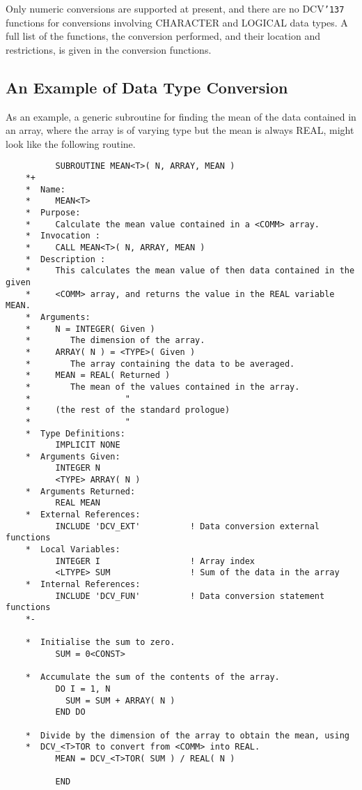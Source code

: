 \documentclass[twoside,11pt]{article}
\renewcommand{\_}{{\tt\char'137}}     %
\newcommand{\htmlref}[2]{#1}
\newcommand{\latexelsehtml}[2]{#1}
\renewcommand{\latexelsehtml}[2]{#2}
\begin{document}
Only numeric conversions are supported at present, and
there are no DCV\_ functions for conversions involving CHARACTER and
LOGICAL data types.
A full list of the functions, the conversion performed, and their
location and restrictions, is given in
\latexelsehtml{Appendix~\ref{ap_b}}{the
\htmlref{conversion functions}{ap_b}}.

\subsection{An Example of Data Type Conversion}

As an example, a generic subroutine for finding the mean of the data
contained in an array, where the array is of varying type but the mean is
always REAL, might look like the following routine.

\begin{verbatim}
          SUBROUTINE MEAN<T>( N, ARRAY, MEAN )
    *+
    *  Name:
    *     MEAN<T>
    *  Purpose:
    *     Calculate the mean value contained in a <COMM> array.
    *  Invocation :
    *     CALL MEAN<T>( N, ARRAY, MEAN )
    *  Description :
    *     This calculates the mean value of then data contained in the given
    *     <COMM> array, and returns the value in the REAL variable MEAN.
    *  Arguments:
    *     N = INTEGER( Given )
    *        The dimension of the array.
    *     ARRAY( N ) = <TYPE>( Given )
    *        The array containing the data to be averaged.
    *     MEAN = REAL( Returned )
    *        The mean of the values contained in the array.
    *                   "
    *     (the rest of the standard prologue)
    *                   "
    *  Type Definitions:
          IMPLICIT NONE
    *  Arguments Given:
          INTEGER N
          <TYPE> ARRAY( N )
    *  Arguments Returned:
          REAL MEAN
    *  External References:
          INCLUDE 'DCV_EXT'          ! Data conversion external functions
    *  Local Variables:
          INTEGER I                  ! Array index
          <LTYPE> SUM                ! Sum of the data in the array
    *  Internal References:
          INCLUDE 'DCV_FUN'          ! Data conversion statement functions
    *-

    *  Initialise the sum to zero.
          SUM = 0<CONST>

    *  Accumulate the sum of the contents of the array.
          DO I = 1, N
            SUM = SUM + ARRAY( N )
          END DO

    *  Divide by the dimension of the array to obtain the mean, using
    *  DCV_<T>TOR to convert from <COMM> into REAL.
          MEAN = DCV_<T>TOR( SUM ) / REAL( N )

          END
\end{verbatim}
\end{document}
